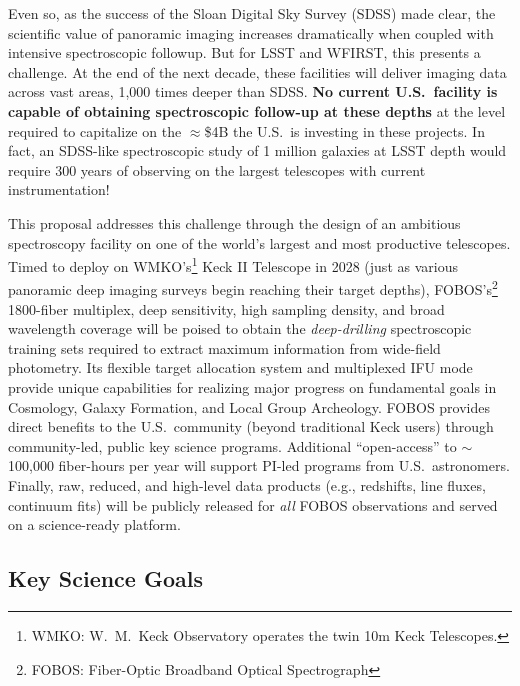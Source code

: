 \documentclass[oneside,11pt]{amsart}
\begin{document}


Even so, as the success of the Sloan Digital Sky Survey (SDSS) made
clear, the scientific value of panoramic imaging increases
dramatically when coupled with intensive spectroscopic followup. But
for LSST and WFIRST, this presents a challenge. At the end of the
next decade, these facilities will deliver imaging data across vast
areas, 1,000 times deeper than SDSS. \textbf{No current U.S.~facility
is capable of obtaining spectroscopic follow-up at these depths} at
the level required to capitalize on the $\approx$\$4B the U.S.\ is
investing in these projects. In fact, an SDSS-like spectroscopic
study of 1 million galaxies at LSST depth would require 300 years of
observing on the largest telescopes with current instrumentation!

This proposal addresses this challenge through the design of an
ambitious spectroscopy facility on one of the world's largest and
most productive telescopes. Timed to deploy on WMKO's\footnote{
%
WMKO: W.~M.\ Keck Observatory operates the twin 10m Keck Telescopes.}
Keck II Telescope in 2028 (just as various panoramic deep imaging
surveys begin reaching their target depths), FOBOS's\footnote{FOBOS:
Fiber-Optic Broadband Optical Spectrograph} 1800-fiber multiplex,
deep sensitivity, high sampling density, and broad wavelength
coverage will be poised to obtain the \emph{deep-drilling}
spectroscopic training sets required to extract maximum information
from wide-field photometry. Its flexible target allocation system and
multiplexed IFU mode provide unique capabilities for realizing major
progress on fundamental goals in Cosmology, Galaxy Formation, and
Local Group Archeology. FOBOS provides direct benefits to the U.S.\
community (beyond traditional Keck users) through community-led,
public key science programs. Additional ``open-access'' to
$\sim$100,000 fiber-hours per year will support PI-led programs from
U.S.\ astronomers. Finally, raw, reduced, and high-level data
products (e.g., redshifts, line fluxes, continuum fits) will be
publicly released for \emph{all} FOBOS observations and served on a
science-ready platform.

\subsection{Key Science Goals}
\label{sec:goals}
\end{document}
